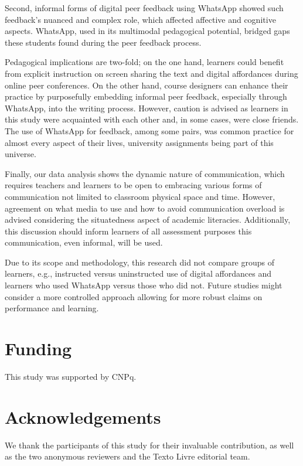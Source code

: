 \documentclass[english]{textolivre}
\begin{document}
Second, informal forms of digital peer feedback using WhatsApp showed such feedback’s nuanced and complex role, which affected affective and cognitive aspects. WhatsApp, used in its multimodal pedagogical potential, bridged gaps these students found during the peer feedback process.

Pedagogical implications are two-fold; on the one hand, learners could benefit from explicit instruction on screen sharing the text and digital affordances during online peer conferences. On the other hand, course designers can enhance their practice by purposefully embedding informal peer feedback, especially through WhatsApp, into the writing process. However, caution is advised as learners in this study were acquainted with each other and, in some cases, were close friends. The use of WhatsApp for feedback, among some pairs, was common practice for almost every aspect of their lives, university assignments being part of this universe.

Finally, our data analysis shows the dynamic nature of communication, which requires teachers and learners to be open to embracing various forms of communication not limited to classroom physical space and time. However, agreement on what media to use and how to avoid communication overload is advised considering the situatedness \cite{santos2021kersch} aspect of academic literacies. Additionally, this discussion should inform learners of all assessment purposes this communication, even informal, will be used.

Due to its scope and methodology, this research did not compare groups of learners, e.g., instructed versus uninstructed use of digital affordances and learners who used WhatsApp versus those who did not. Future studies might consider a more controlled approach allowing for more robust claims on performance and learning.

\section{Funding}
This study was supported by CNPq.


\section{Acknowledgements}
We thank the participants of this study for their invaluable contribution, as well as the two anonymous reviewers and the Texto Livre editorial team.   

\printbibliography\label{sec-bib}
\end{document}
